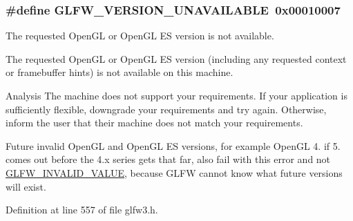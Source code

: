 \subsubsection[{G\+L\+F\+W\+\_\+\+V\+E\+R\+S\+I\+O\+N\+\_\+\+U\+N\+A\+V\+A\+I\+L\+A\+B\+L\+E}]{\setlength{\rightskip}{0pt plus 5cm}\#define G\+L\+F\+W\+\_\+\+V\+E\+R\+S\+I\+O\+N\+\_\+\+U\+N\+A\+V\+A\+I\+L\+A\+B\+L\+E~0x00010007}\label{group__errors_gad16c5565b4a69f9c2a9ac2c0dbc89462}


The requested Open\+G\+L or Open\+G\+L E\+S version is not available. 

The requested Open\+G\+L or Open\+G\+L E\+S version (including any requested context or framebuffer hints) is not available on this machine.

\begin{DoxyParagraph}{Analysis}
The machine does not support your requirements. If your application is sufficiently flexible, downgrade your requirements and try again. Otherwise, inform the user that their machine does not match your requirements.
\end{DoxyParagraph}
\begin{DoxyParagraph}{}
Future invalid Open\+G\+L and Open\+G\+L E\+S versions, for example Open\+G\+L 4. if 5. comes out before the 4.\+x series gets that far, also fail with this error and not \hyperlink{group__errors_gaaf2ef9aa8202c2b82ac2d921e554c687}{G\+L\+F\+W\+\_\+\+I\+N\+V\+A\+L\+I\+D\+\_\+\+V\+A\+L\+U\+E}, because G\+L\+F\+W cannot know what future versions will exist. 
\end{DoxyParagraph}


Definition at line 557 of file glfw3.\+h.

